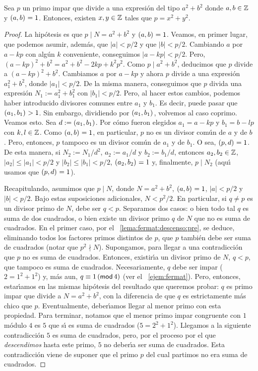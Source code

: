 \begin{lemaFermat}[Descenso]\label{lema:fermat:descenso}
	Sea $p$ un primo impar que divide a una expresi\'on del tipo $a^2+b^2$
	donde $a,b\in\Enteros$ y $\mcd{a,b}=1$. Entonces, existen
	$x,y\in\Enteros$ tales que $p=x^2+y^2$.
\end{lemaFermat}

\begin{proof}
	La hip\'otesis es que $p\mid N=a^2+b^2$ y $\mcd{a,b}=1$.
	Veamos, en primer lugar, que podemos asumir, adem\'as, que $|a|<p/2$
	y que $|b|<p/2$.
	Cambiando $a$ por $a-kp$ con alg\'un $k$ conveniente, conseguimos
	$|a-kp|<p/2$. Pero, $(a-kp)^2+b^2=a^2+b^2-2kp+k^2p^2$. Como
	$p\mid a^2+b^2$, deducimos que $p$ divide a $(a-kp)^2+b^2$. Cambiamos
	$a$ por $a-kp$ y ahora $p$ divide a una expresi\'on $a_1^2+b^2$, donde
	$|a_1|<p/2$.
	De la misma manera, conseguimos que $p$ divida una expresi\'on
	$N_1:=a_1^2+b_1^2$ con $|b_1|<p/2$.
	Pero, al hacer estos cambios, podemos haber introducido divisores
	comunes entre $a_1$ y $b_1$. Es decir, puede pasar que
	$\mcd{a_1,b_1}>1$.
	Sin embargo, dividiendo por $\mcd{a_1,b_1}$, volvemos al caso
	coprimo. Veamos esto. Sea $d:=\mcd{a_1,b_1}$. Por c\'omo fueron
	elegidos $a_1=a-kp$ y $b_1=b-lp$ con $k,l\in\Enteros$. Como
	$\mcd{a,b}=1$, en particular, $p$ no es un divisor com\'un de $a$ y
	de $b$. Pero, entonces, $p$ tampoco es un divisor com\'un de $a_1$ y
	de $b_1$. O sea, $\mcd{p,d}=1$. De esta manera, si $N_2:=N_1/d^2$,
	$a_2:=a_1/d$ y $b_2:=b_1/d$, entonces $a_2,b_2\in\Enteros$,
	$|a_2|\leq |a_1|<p/2$ y $|b_2|\leq |b_1|<p/2$, $\mcd{a_2,b_2}=1$ y,
	finalmente, $p\mid N_2$ (aqu\'{\i} usamos que $\mcd{p,d}=1$).

	Recapitulando, asumimos que $p\mid N$, donde $N=a^2+b^2$,
	$\mcd{a,b}=1$, $|a|<p/2$ y $|b|<p/2$. Bajo estas suposiciones
	adicionales, $N<p^2/2$. En particular, si $q\neq p$ es un divisor
	primo de $N$, debe ser $q<p$. Separamos dos casos: o bien todo tal
	$q$ es suma de dos cuadrados, o bien existe un divisor primo $q$ de
	$N$ que no es suma de cuadrados.
	En el primer caso, por el \lemaname~\ref{lema:fermat:descenso:pre},
	se deduce, eliminando todos los factores primos distintos de $p$,
	que $p$ tambi\'en debe ser suma de cuadrados (notar que $p^2\nmid N$).
	Supongamos, para llegar a una contradicci\'on que $p$ no es suma de
	cuadrados. Entonces, existir\'{\i}a un divisor primo de $N$, $q<p$,
	que tampoco es suma de cuadrados. Necesariamente, $q$ debe ser impar
	($2=1^2+1^2$) y, m\'as aun, $q\equiv 1\tmodulo[4]$ (ver el
	\ejemname~\ref{ejem:fermat}). Pero, entonces, estar\'{\i}amos en las
	mismas hip\'otesis del resultado que queremos probar: $q$ es primo
	impar que divide a $N=a^2+b^2$, con la diferencia de que $q$ es
	estrictamente m\'as chico que $p$. Eventualmente, deber\'{\i}amos
	llegar al menor primo con esta propiedad. Para terminar, notamos que
	el menor primo impar congruente con $1$ m\'odulo $4$ es $5$ que
	s\'{\i} es suma de cuadrados ($5=2^2+1^2$). Llegamos a la siguiente
	contradicci\'on $5$ es suma de cuadrados, pero, por el proceso por
	el que \emph{descendimos} hasta este primo, $5$ no deber\'{\i}a ser
	suma de cuadrados. Esta contradicci\'on viene de suponer que el primo
	$p$ del cual partimos no era suma de cuadrados.
\end{proof}

